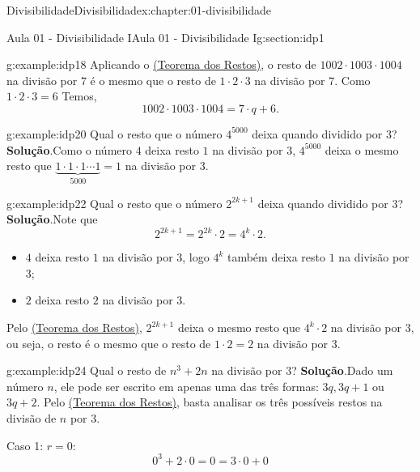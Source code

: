 \documentclass[oneside,10pt,]{book}
\newcommand{\blocktitlefont}{\relax}
\numberwithin{equation}{section}
\begin{document}
\begin{chapterptx}{Divisibilidade}{}{Divisibilidade}{}{}{x:chapter:01-divisibilidade}
\begin{sectionptx}{Aula 01 - Divisibilidade I}{}{Aula 01 - Divisibilidade I}{}{}{g:section:idp1}
\begin{example}{}{g:example:idp18}
Aplicando o \hyperref[x:theorem:teo-restos]{(Teorema dos Restos)}, o resto de \(1002\cdot1003\cdot1004\) na divisão por \(7\) é o mesmo que o resto de \(1\cdot 2\cdot 3\) na divisão por \(7\). Como \(1\cdot 2\cdot 3 = 6\) Temos,%
\begin{equation*}
1002\cdot1003\cdot1004 = 7\cdot q + 6.
\end{equation*}
%
\end{example}
\begin{example}{}{g:example:idp20}%
Qual o resto que o número \(4^{5000}\) deixa quando dividido por \(3\)?%
\textbf{\blocktitlefont Solução}.\hypertarget{g:solution:idp21}{}\quad{}Como o número \(4\) deixa resto \(1\) na divisão por \(3\), \(4^{5000}\) deixa o mesmo resto que \(\underbrace{1\cdot 1\cdot 1\cdots 1}_{5000} = 1\) na divisão por \(3\).%
\end{example}
\begin{example}{}{g:example:idp22}%
Qual o resto que o número \(2^{2k+1}\) deixa quando dividido por \(3\)?%
\textbf{\blocktitlefont Solução}.\hypertarget{g:solution:idp23}{}\quad{}Note que%
\begin{equation*}
2^{2k+1} = 2^{2k}\cdot 2 = 4^k\cdot 2.
\end{equation*}
%
%
\begin{itemize}[label=\textbullet]
\item{}\(4\) deixa resto \(1\) na divisão por \(3\), logo \(4^k\) também deixa resto \(1\) na divisão por 3;%
\item{}\(2\) deixa resto \(2\) na divisão por \(3\).%
\end{itemize}
Pelo \hyperref[x:theorem:teo-restos]{(Teorema dos Restos)}, \(2^{2k+1}\) deixa o mesmo resto que \(4^k\cdot 2\) na divisão por \(3\), ou seja, o resto é o mesmo que o resto de \(1\cdot 2 = 2\) na divisão por \(3\).%
\end{example}
\begin{example}{}{g:example:idp24}%
Qual o resto de \(n^3+2n\) na divisão por \(3\)?%
\textbf{\blocktitlefont Solução}.\hypertarget{g:solution:idp25}{}\quad{}Dado um número \(n\), ele pode ser escrito em apenas uma das três formas: \(3q, 3q+1\) ou \(3q+2\). Pelo \hyperref[x:theorem:teo-restos]{(Teorema dos Restos)}, basta analisar os três possíveis restos na divisão de \(n\) por \(3\).%
\par
Caso 1: \(r = 0\):%
\begin{equation*}
0^3+2\cdot 0 = 0 = 3\cdot 0+0
\end{equation*}
%
\par

\end{example}
\end{sectionptx}
\end{chapterptx}
\end{document}
